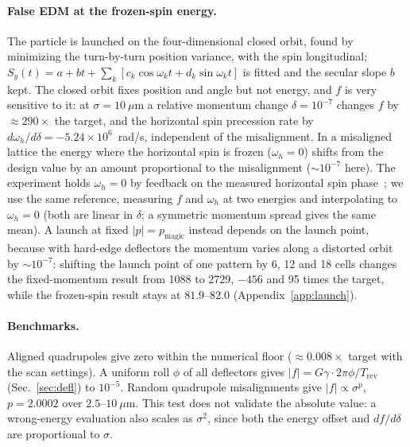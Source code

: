 \documentclass[aps,prab,reprint,superscriptaddress,nofootinbib]{revtex4-2}
\newif\iftodo
\newcommand{\todo}[1]{\iftodo{\color{red}\textbf{TODO:} #1}\fi}
\begin{document}
\paragraph*{False EDM at the frozen-spin energy.} The particle is launched on the four-dimensional closed
orbit, found by minimizing the turn-by-turn position variance, with the spin longitudinal; $S_y(t)=a+bt+
\sum_k[c_k\cos\omega_kt+d_k\sin\omega_kt]$ is fitted and the secular slope $b$ kept. The closed orbit fixes
position and angle but not energy, and $f$ is very sensitive to it: at $\sigma=10~\mu$m a relative momentum
change $\delta=10^{-7}$ changes $f$ by $\approx290\times$ the target, and the horizontal spin precession rate
by $d\omega_h/d\delta=-5.24\times10^6$~rad/s, independent of the misalignment. In a misaligned lattice the
energy where the horizontal spin is frozen ($\omega_h=0$) shifts from the design value by an amount
proportional to the misalignment ($\sim10^{-7}$ here). The experiment holds $\omega_h=0$ by feedback on the
measured horizontal spin phase~\cite{jedi_phaselock}; we use the same reference, measuring $f$ and $\omega_h$
at two energies and interpolating to $\omega_h=0$ (both are linear in $\delta$; a symmetric momentum spread
gives the same mean). A launch at fixed $|p|=p_\text{magic}$ instead depends on the launch point, because
with hard-edge deflectors the momentum varies along a distorted orbit by $\sim10^{-7}$: shifting the launch
point of one pattern by 6, 12 and 18 cells changes the fixed-momentum result from 1088 to 2729, $-456$ and 95
times the target, while the frozen-spin result stays at $81.9$--$82.0$ (Appendix~\ref{app:launch}).
\todo{Cite our earlier arXiv paper on the frozen-spin energy shift with lattice imperfections.}

\paragraph*{Benchmarks.} Aligned quadrupoles give zero within the numerical floor ($\approx0.008\times$
target with the scan settings). A uniform roll $\phi$ of all deflectors gives
$|f|=G\gamma\cdot2\pi\phi/T_\text{rev}$ (Sec.~\ref{sec:defl}) to $10^{-5}$. Random quadrupole misalignments
give $|f|\propto\sigma^{p}$, $p=2.0002$ over $2.5$--$10~\mu$m. This test does not validate the absolute value:
a wrong-energy evaluation also scales as $\sigma^2$, since both the energy offset and $df/d\delta$ are
proportional to $\sigma$.

\end{document}
